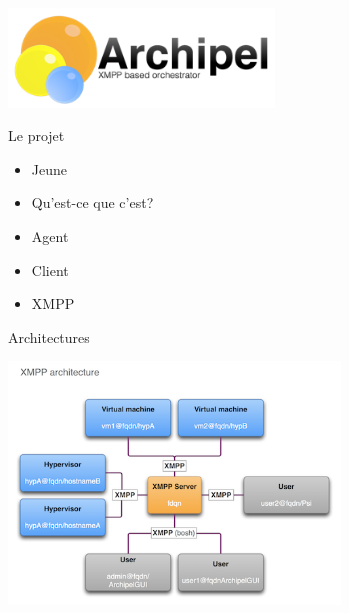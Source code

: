 

%
\begin{frame}
  \begin{center}
   \includegraphics[width=200pt]{images_presentation/logo_archipel.png}
  \end{center}
\end{frame}

\begin{frame}{Le projet}
\begin{center}
  \begin{itemize}
    \item Jeune
\pause
    \item Qu'est-ce que c'est?
\pause
    \item Agent
\pause
    \item Client
\pause
    \item XMPP
  \end{itemize}
\end{center}
\end{frame}


\begin{frame}{Architectures}
\begin{center}
  \includegraphics[width=250pt]{images_presentation/archipel.png}
\end{center}
\end{frame}

